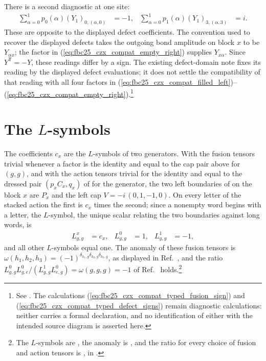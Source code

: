 \documentclass{article}
\begin{document}
There is a second diagnostic at one site:
\begin{align}
    \sum_{\alpha=0}^1p_0(\alpha)(Y_1)_{0,(\alpha,0)} & =-1,
                                                     & \sum_{\alpha=0}^1p_1(\alpha)(Y_1)_{3,(\alpha,3)} & =i.
    \label{eq:fbc25_czx_compat_typed_defect_signs}
\end{align}
These are opposite to the displayed defect coefficients. The convention used to recover the displayed defects takes the outgoing bond amplitude on block $x$ to be $Y_{\alpha x}$; the factor in
(\ref{eq:fbc25_czx_compat_empty_right}) supplies $Y_{x\alpha}$. Since $Y^{\mathsf T}=-Y$, these readings differ by a sign. The existing defect-domain note fixes its reading by the displayed defect evaluations; it does not settle the compatibility of that reading with all four factors in
(\ref{eq:fbc25_czx_compat_filled_left})--(\ref{eq:fbc25_czx_compat_empty_right}).\footnote{See
    . The calculations
    (\ref{eq:fbc25_czx_compat_typed_fusion_sign}) and
    (\ref{eq:fbc25_czx_compat_typed_defect_signs}) remain diagnostic calculations: neither carries a formal declaration, and no identification of either with the intended source diagram is asserted here.}

\section{The \texorpdfstring{$L$}{L}-symbols}

The coefficients $c_x$ are the $L$-symbols of two generators. With the
fusion tensors trivial whenever a factor is the identity and equal to the
cap pair above for $(g,g)$, and with the action tensors trivial for the
identity and equal to the dressed pair $(p_xC_x,q_x)$ of
 for the generator, the
two left boundaries of  on the block $x$ are
$P_x$ and the left cap $V=-i\,(0,1,-1,0)$. On every letter of the stacked
action the first is $c_x$ times the second; since a nonempty word begins
with a letter, the $L$-symbol, the unique scalar relating the two
boundaries against long words, is
\begin{align}
    L^x_{g,g} & =c_x, & L^0_{g,g} & =1, & L^1_{g,g} & =-1,
    \label{eq:fbc25_czx_compat_l_symbols}
\end{align}
and all other $L$-symbols equal one. The anomaly of these fusion tensors is
$\omega(h_1,h_2,h_3)=(-1)^{\delta_{h_1,g}\delta_{h_2,g}\delta_{h_3,g}}$, as
displayed in Ref.~\cite[lines~4695--4698]{FrancoRubio2025MPUGauging}, and the
ratio $L^0_{g,g}L^0_{g,e}/(L^1_{g,g}L^0_{e,g})=\omega(g,g,g)=-1$ of
Ref.~\cite[line~5121]{FrancoRubio2025MPUGauging} holds.\footnote{The
    $L$-symbols are , the
    anomaly is , and the ratio for
    every choice of fusion and action tensors is
    , in
    .}
\end{document}
